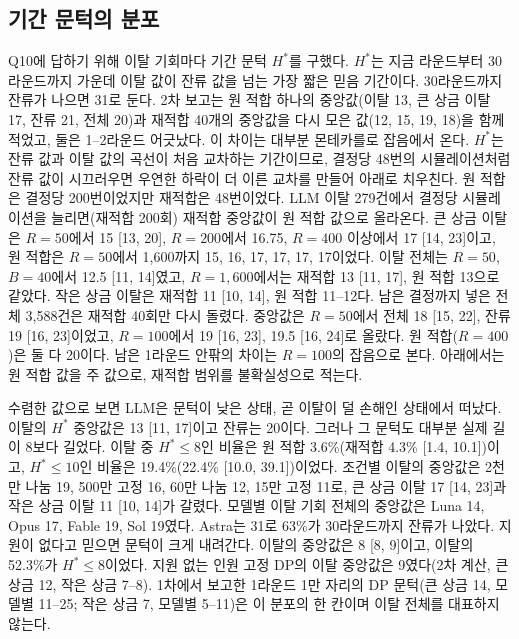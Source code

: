 \subsection{기간 문턱의 분포}\label{val:w1-horizon}

Q10에 답하기 위해 이탈 기회마다 기간 문턱 $H^{*}$를 구했다. $H^{*}$는 지금 라운드부터 30라운드까지 가운데 이탈 값이 잔류 값을 넘는 가장 짧은 믿음 기간이다. 30라운드까지 잔류가 나으면 31로 둔다. 2차 보고는 원 적합 하나의 중앙값(이탈 13, 큰 상금 이탈 17, 잔류 21, 전체 20)과 재적합 40개의 중앙값을 다시 모은 값(12, 15, 19, 18)을 함께 적었고, 둘은 1--2라운드 어긋났다. 이 차이는 대부분 몬테카를로 잡음에서 온다. $H^{*}$는 잔류 값과 이탈 값의 곡선이 처음 교차하는 기간이므로, 결정당 48번의 시뮬레이션처럼 잔류 값이 시끄러우면 우연한 하락이 더 이른 교차를 만들어 아래로 치우친다. 원 적합은 결정당 200번이었지만 재적합은 48번이었다. LLM 이탈 279건에서 결정당 시뮬레이션을 늘리면(재적합 200회) 재적합 중앙값이 원 적합 값으로 올라온다. 큰 상금 이탈은 $R=50$에서 15 [13, 20], $R=200$에서 16.75, $R=400$ 이상에서 17 [14, 23]이고, 원 적합은 $R=50$에서 1,600까지 15, 16, 17, 17, 17, 17이었다. 이탈 전체는 $R=50$, $B=40$에서 12.5 [11, 14]였고, $R=1{,}600$에서는 재적합 13 [11, 17], 원 적합 13으로 같았다. 작은 상금 이탈은 재적합 11 [10, 14], 원 적합 11--12다. 남은 결정까지 넣은 전체 3,588건은 재적합 40회만 다시 돌렸다. 중앙값은 $R=50$에서 전체 18 [15, 22], 잔류 19 [16, 23]이었고, $R=100$에서 19 [16, 23], 19.5 [16, 24]로 올랐다. 원 적합($R=400$)은 둘 다 20이다. 남은 1라운드 안팎의 차이는 $R=100$의 잡음으로 본다. 아래에서는 원 적합 값을 주 값으로, 재적합 범위를 불확실성으로 적는다.

수렴한 값으로 보면 LLM은 문턱이 낮은 상태, 곧 이탈이 덜 손해인 상태에서 떠났다. 이탈의 $H^{*}$ 중앙값은 13 [11, 17]이고 잔류는 20이다. 그러나 그 문턱도 대부분 실제 길이 8보다 길었다. 이탈 중 $H^{*}\le 8$인 비율은 원 적합 3.6\%(재적합 4.3\% [1.4, 10.1])이고, $H^{*}\le 10$인 비율은 19.4\%(22.4\% [10.0, 39.1])이었다. 조건별 이탈의 중앙값은 2천만 나눔 19, 500만 고정 16, 60만 나눔 12, 15만 고정 11로, 큰 상금 이탈 17 [14, 23]과 작은 상금 이탈 11 [10, 14]가 갈렸다. 모델별 이탈 기회 전체의 중앙값은 Luna 14, Opus 17, Fable 19, Sol 19였다. Astra는 31로 63\%가 30라운드까지 잔류가 나았다. 지원이 없다고 믿으면 문턱이 크게 내려간다. 이탈의 중앙값은 8 [8, 9]이고, 이탈의 52.3\%가 $H^{*}\le 8$이었다. 지원 없는 인원 고정 DP의 이탈 중앙값은 9였다(2차 계산, 큰 상금 12, 작은 상금 7--8). 1차에서 보고한 1라운드 1만 자리의 DP 문턱(큰 상금 14, 모델별 11--25; 작은 상금 7, 모델별 5--11)은 이 분포의 한 칸이며 이탈 전체를 대표하지 않는다.

